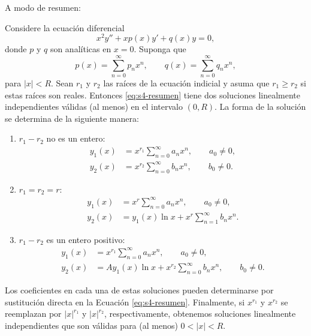 A modo de resumen:
 
\begin{remark}
  Considere la ecuación diferencial
\begin{equation}
x^2 y'' + xp(x)y' + q(x)y = 0,
\label{eq:s4-resumen}
\end{equation}
donde $p$ y $q$ son analíticas en $x = 0$. Suponga que
\[ p(x) = \sum_{n=0}^{\infty} p_n x^n, \qquad q(x) = \sum_{n=0}^{\infty} q_n x^n, \]
para $|x| < R$. Sean $r_1$ y $r_2$ las raíces de la ecuación indicial y asuma que $r_1 \ge r_2$ si estas raíces son reales. Entonces \eqref{eq:s4-resumen} tiene dos soluciones linealmente independientes válidas (al menos) en el intervalo $(0, R)$. La forma de la solución se determina de la siguiente manera:
 
\begin{enumerate}
    \item $r_1 - r_2$ no es un entero:
    \begin{align}
    y_1(x) &= x^{r_1} \sum_{n=0}^{\infty} a_n x^n, \qquad a_0 \neq 0, \label{eq:s4-I-1}\\
    y_2(x) &= x^{r_2} \sum_{n=0}^{\infty} b_n x^n, \qquad b_0 \neq 0. \label{eq:s4-I-2}
    \end{align}
    \item $r_1 = r_2 = r$:
    \begin{align}
    y_1(x) &= x^r \sum_{n=0}^{\infty} a_n x^n, \qquad a_0 \neq 0, \label{eq:s4-II-1}\\
    y_2(x) &= y_1(x) \ln x + x^r \sum_{n=1}^{\infty} b_n x^n. \label{eq:s4-II-2}
    \end{align}
    \item $r_1 - r_2$ es un entero positivo:
    \begin{align}
    y_1(x) &= x^{r_1} \sum_{n=0}^{\infty} a_n x^n, \qquad a_0 \neq 0, \label{eq:s4-III-1}\\
    y_2(x) &= A y_1(x) \ln x + x^{r_2} \sum_{n=0}^{\infty} b_n x^n, \qquad b_0 \neq 0. \label{eq:s4-III-2}
    \end{align}
\end{enumerate}
 
Los coeficientes en cada una de estas soluciones pueden determinarse por sustitución directa en la Ecuación \eqref{eq:s4-resumen}. Finalmente, si $x^{r_1}$ y $x^{r_2}$ se reemplazan por $|x|^{r_1}$ y $|x|^{r_2}$, respectivamente, obtenemos soluciones linealmente independientes que son válidas para (al menos) $0 < |x| < R$.
\end{remark}
 

